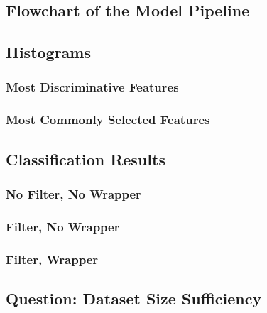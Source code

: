 \documentclass[12pt,twoside,a4paper]{article}
\begin{document}
\subsection{Flowchart of the Model Pipeline}

\subsection{Histograms}

\subsubsection{Most Discriminative Features}

\subsubsection{Most Commonly Selected Features}

\subsection{Classification Results}

\subsubsection{No Filter, No Wrapper}

\subsubsection{Filter, No Wrapper}

\subsubsection{Filter, Wrapper}

\subsection{Question: Dataset Size Sufficiency}
\end{document}
